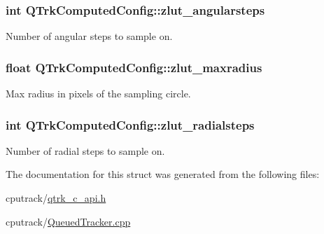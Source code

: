 \subsubsection[{\texorpdfstring{zlut\+\_\+angularsteps}{zlut_angularsteps}}]{\setlength{\rightskip}{0pt plus 5cm}int Q\+Trk\+Computed\+Config\+::zlut\+\_\+angularsteps}\hypertarget{struct_q_trk_computed_config_a01653574d81ab70e4910c984fb7f7482}{}\label{struct_q_trk_computed_config_a01653574d81ab70e4910c984fb7f7482}


Number of angular steps to sample on. 

\subsubsection[{\texorpdfstring{zlut\+\_\+maxradius}{zlut_maxradius}}]{\setlength{\rightskip}{0pt plus 5cm}float Q\+Trk\+Computed\+Config\+::zlut\+\_\+maxradius}\hypertarget{struct_q_trk_computed_config_a13ceb0d4551d3bd5343ecce7a093d65b}{}\label{struct_q_trk_computed_config_a13ceb0d4551d3bd5343ecce7a093d65b}


Max radius in pixels of the sampling circle. 

\subsubsection[{\texorpdfstring{zlut\+\_\+radialsteps}{zlut_radialsteps}}]{\setlength{\rightskip}{0pt plus 5cm}int Q\+Trk\+Computed\+Config\+::zlut\+\_\+radialsteps}\hypertarget{struct_q_trk_computed_config_ad1a121fa7d3152df6788ff285e4d2dc6}{}\label{struct_q_trk_computed_config_ad1a121fa7d3152df6788ff285e4d2dc6}


Number of radial steps to sample on. 



The documentation for this struct was generated from the following files\+:\begin{DoxyCompactItemize}
\item 
cputrack/\hyperlink{qtrk__c__api_8h}{qtrk\+\_\+c\+\_\+api.\+h}\item 
cputrack/\hyperlink{_queued_tracker_8cpp}{Queued\+Tracker.\+cpp}\end{DoxyCompactItemize}
